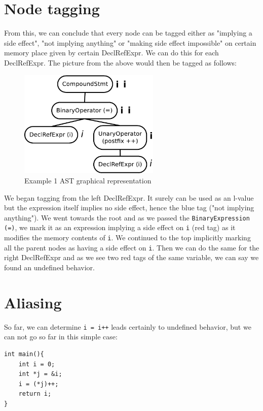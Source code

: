 \section{Node tagging}
From this, we can conclude that every node can be tagged either as "implying a side effect", "not implying anything" or "making side effect impossible" on certain memory place given by certain DeclRefExpr. We can do this for each DeclRefExpr. The picture from the above would then be tagged as follows:

\begin{figure}[H]
  \caption{Example 1 AST graphical representation}
  \centering
    \includegraphics[width=0.6\textwidth]{fig/example1G-tagged.pdf}
\end{figure}

We began tagging from the left DeclRefExpr. It surely can be used as an l-value but the expression itself implies no side effect, hence the blue tag ("not implying anything"). We went towards the root and as we passed the \verb|BinaryExpression (=)|, we mark it as an expression implying a side effect on \verb|i| (red tag) as it modifies the memory contents of \verb|i|. We continued to the top implicitly marking all the parent nodes as having a side effect on \verb|i|. Then we can do the same for the right DeclRefExpr and as we see two red tags of the same variable, we can say we found an undefined behavior.

\section{Aliasing}
So far, we can determine \verb|i = i++| leads certainly to undefined behavior, but we can not go so far in this simple case:

\begin{lstlisting}
int main(){
	int i = 0;
	int *j = &i;
	i = (*j)++;
    return i;
}
\end{lstlisting}

